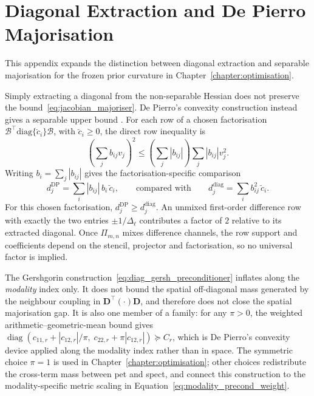 \chapter{Diagonal Extraction and De Pierro Majorisation}
\label{app:depierro_majorisation}
\label{subsubsec:depierro_gap}

This appendix expands the distinction between diagonal extraction and separable majorisation for the frozen prior curvature in Chapter~\ref{chapter:optimisation}.

Simply extracting a diagonal from the non-separable Hessian does not preserve the bound~\eqref{eq:jacobian_majoriser}. De Pierro's convexity construction instead gives a separable upper bound \cite{depierroModifiedExpectationMaximization1995a}. For each row of a chosen factorisation $\mathcal{B}^\top\mathrm{diag}\{\breve c_i\}\mathcal{B}$, with $\breve c_i\geq0$, the direct row inequality is
\begin{equation*}
    \left(\sum_j b_{ij}v_j\right)^2
    \leq
    \left(\sum_j |b_{ij}|\right)
    \sum_j |b_{ij}|v_j^2.
\end{equation*}
Writing $b_i=\sum_j|b_{ij}|$ gives the factorisation-specific comparison
\begin{equation}
    d_j^{\mathrm{DP}}
    =
    \sum_i |b_{ij}|\,b_i\,\breve c_i ,
    \qquad\text{compared with}\qquad
    d_j^{\mathrm{diag}}
    =
    \sum_i b_{ij}^2\,\breve c_i .
    \label{eq:depierro_vs_diag}
\end{equation}
For this chosen factorisation, $d_j^{\mathrm{DP}}\geq d_j^{\mathrm{diag}}$. An unmixed first-order difference row with exactly the two entries $\pm1/\Delta_\ell$ contributes a factor of $2$ relative to its extracted diagonal. Once $\Pi_{m,n}$ mixes difference channels, the row support and coefficients depend on the stencil, projector and factorisation, so no universal factor is implied.

The Gershgorin construction~\eqref{eq:diag_gersh_preconditioner} inflates along the \emph{modality} index only. It does not bound the spatial off-diagonal mass generated by the neighbour coupling in $\bm{D}^\top(\cdot)\bm{D}$, and therefore does not close the spatial majorisation gap. It is also one member of a family: for any $\pi>0$, the weighted arithmetic--geometric-mean bound gives $\operatorname{diag}(c_{11,r}+|c_{12,r}|/\pi,\;c_{22,r}+\pi|c_{12,r}|)\succeq C_r$, which is De Pierro's convexity device applied along the modality index rather than in space. The symmetric choice $\pi=1$ is used in Chapter~\ref{chapter:optimisation}; other choices redistribute the cross-term mass between \gls{pet} and \gls{spect}, and connect this construction to the modality-specific metric scaling in Equation~\eqref{eq:modality_precond_weight}.

